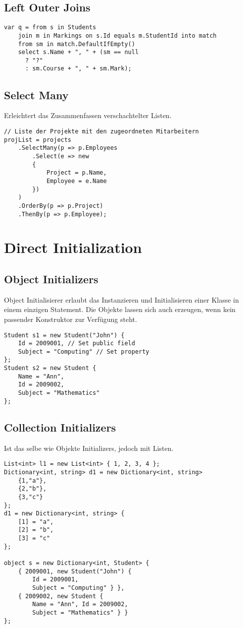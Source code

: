 \subsection{Left Outer Joins}
\begin{lstlisting}
var q = from s in Students
	join m in Markings on s.Id equals m.StudentId into match 
	from sm in match.DefaultIfEmpty()
	select s.Name + ", " + (sm == null
      ? "?"
      : sm.Course + ", " + sm.Mark);	
\end{lstlisting}

\subsection{Select Many}
Erleichtert das Zusammenfassen verschachtelter Listen.
\begin{lstlisting}
// Liste der Projekte mit den zugeordneten Mitarbeitern
projList = projects
    .SelectMany(p => p.Employees
        .Select(e => new
        {
            Project = p.Name,
            Employee = e.Name
        })
    )
    .OrderBy(p => p.Project)
    .ThenBy(p => p.Employee);
\end{lstlisting}

\pagebreak
\section{Direct Initialization}
\subsection{Object Initializers}
Object Initialisierer erlaubt das Instanzieren und Initialisieren einer Klasse in einem einzigen Statement. Die Objekte lassen sich auch erzeugen, wenn kein passender Konstruktor zur Verfügung steht.

\begin{lstlisting}
Student s1 = new Student("John") {
	Id = 2009001, // Set public field 
	Subject = "Computing" // Set property
}; 
Student s2 = new Student {
	Name = "Ann", 
	Id = 2009002, 
	Subject = "Mathematics"
};
\end{lstlisting}


\subsection{Collection Initializers}
Ist das selbe wie Objekte Initializers, jedoch mit Listen.

\begin{lstlisting}
List<int> l1 = new List<int> { 1, 2, 3, 4 }; 
Dictionary<int, string> d1 = new Dictionary<int, string>
	{1,"a"}, 
	{2,"b"}, 
	{3,"c"}
};
d1 = new Dictionary<int, string> { 
	[1] = "a",
	[2] = "b",
	[3] = "c"
};

object s = new Dictionary<int, Student> {
	{ 2009001, new Student("John") { 
		Id = 2009001,
		Subject = "Computing" } },
	{ 2009002, new Student {
    	Name = "Ann", Id = 2009002,
        Subject = "Mathematics" } }
};
\end{lstlisting}

